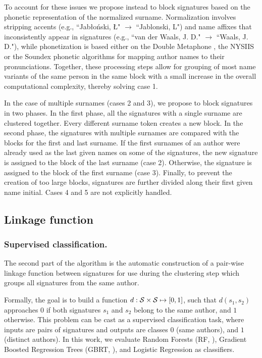 \documentclass[runningheads,a4paper]{llncs}
\makeatletter
\newcommand*{\eg}{e.g.\@\xspace}
\makeatother
\begin{document}
To account for these issues we propose instead to block signatures based on the
phonetic representation of the normalized surname.
Normalization involves stripping accents (\eg, ``Jab\l{}o\'nski, \L{}" $\rightarrow$ ``Jablonski, L") and name
affixes that inconsistently appear in signatures (\eg, ``van der Waals, J. D."
$\rightarrow$ ``Waals, J. D."), while phonetization is based either on the
Double Metaphone \cite{doublemetaphone}, the NYSIIS \cite{nysiis} or the
Soundex \cite{Soundex} phonetic algorithms for mapping author names to their pronunciations.
Together, these processing steps allow for grouping of most name variants of the same
person in the same block with a small increase in the overall computational complexity, thereby solving case 1.

In the case of multiple surnames (cases 2 and 3), we propose to block
signatures in two phases.
In the first phase, all the signatures with a single surname are clustered together.
Every different surname token creates a new block.
In the second phase, the signatures with multiple surnames are compared
with the blocks for the first and last surname.
If the first surnames of an author were already used as the last given names on some of the signatures, the
new signature is assigned to the block of the last surname (case 2).
Otherwise, the signature is assigned to the block of the first surname (case 3).
Finally, to prevent the creation of too large blocks, signatures are further divided
along their first given name initial.
Cases 4 and 5 are not explicitly handled.

\subsection{Linkage function}
\label{methods:linkage}

\subsubsection{Supervised classification.} The second part of the algorithm is the
automatic construction of a pair-wise linkage function between signatures for use
during the clustering step which groups all signatures from the same author.

Formally, the goal is to build a function $d: {\cal S} \times {\cal S} \mapsto
[0, 1]$, such that $d(s_1, s_2)$ approaches $0$ if both signatures $s_1$ and
$s_2$ belong to the same author, and $1$ otherwise.
This problem can be cast as a supervised classification task, where inputs
are pairs of signatures and outputs are classes $0$ (same authors), and $1$
(distinct authors). In this work, we evaluate Random Forests (RF, \cite{breiman2001random}),
Gradient Boosted Regression Trees (GBRT, \cite{friedman2001greedy}),
and Logistic Regression \cite{fan2008liblinear} as classifiers.
\end{document}
